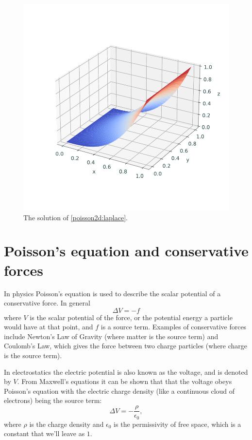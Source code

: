 \begin{figure}
\includegraphics[width=\textwidth]{figures/poisson_square.pdf}
\caption{The solution of \eqref{poisson2d:laplace}.}
\end{figure}

\section*{Poisson's equation and conservative forces}
In physics Poisson's equation is used to describe the scalar potential of a conservative force.
In general
\[ \Delta V = - f\]
where $V$ is the scalar potential of the force, or the potential energy a particle would have at that point, and $f$ is a source term.
Examples of conservative forces include Newton's Law of Gravity (where matter is the source term) and Coulomb's Law, which gives the force between two charge particles (where charge is the source term).

In electrostatics the electric potential is also known as the voltage, and is denoted by $V.$
From Maxwell's equations it can be shown that that the voltage obeys Poisson's equation with the electric charge density (like a continuous cloud of electrons) being the source term:
\[
 \Delta V = -\frac{\rho}{\epsilon_0},
\]
where $\rho$ is the charge density and $\epsilon_0$ is the permissivity of
free space, which is a constant that we'll leave as $1$.

